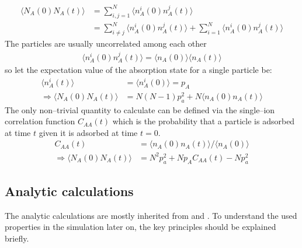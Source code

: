 \documentclass[a4paper, parskip=half]{scrartcl}
\newcommand{\myEqLabel}[1]{\label{eq:#1}}
\begin{document}
\begin{align}
\langle N_A(0) N_A(t)\rangle &= \sum_{i,j = 1}^N \langle n_A^i(0) n_A^j(t)\rangle\\
&= \sum_{i \neq j}^N \langle n_A^i(0) n_A^j(t)\rangle + \sum_{i =1}^N \langle n_A^i(0) n_A^j(t)\rangle
\end{align}
The particles are usually uncorrelated among each other 
\begin{align}
\langle n_A^i(0) n_A^j(t)\rangle = \langle n_A(0) \rangle\langle n_A(t) \rangle
\end{align}
so let the expectation value of the absorption state for a single particle be:
\begin{align}
\langle n_A^i(t) \rangle &= \langle n_A^i(0) \rangle = p_A \myEqLabel{p_A}\\
\Rightarrow \langle N_A(0) N_A(t)\rangle &= N(N-1)p_a^2 + N\langle n_A(0) n_A(t)\rangle
\end{align}
The only non--trivial quantity to calculate can be defined via the single--ion correlation function $C_{AA}(t)$ which is the probability that a particle is adsorbed at time $t$ given it is adsorbed at time $t=0$.
\begin{align}
C_{AA}(t) &= \langle n_A(0) n_A(t) \rangle / \langle n_A(0) \rangle \\
\Rightarrow \langle N_A(0) N_A(t)\rangle &= N^2p_a^2 + Np_AC_{AA}(t) - Np_a^2 \myEqLabel{N_A}
\end{align}
\subsection{Analytic calculations}
The analytic calculations are mostly inherited from \cite{netzpaper} and \cite{netzpaper2}. To understand the used properties in the simulation later on, the key principles should be explained briefly.
\end{document}
